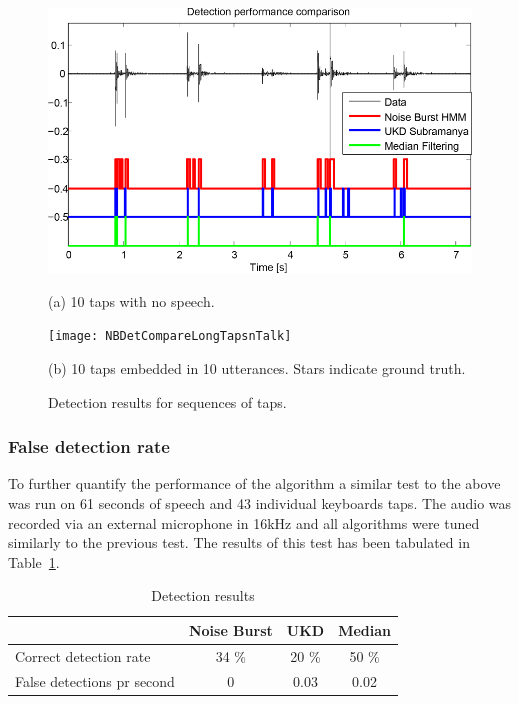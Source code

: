 \begin{figure}
\begin{minipage}[b]{1.0\linewidth}
  \centering
  \centerline{\includegraphics[width=12.5cm]{NBDetCompareLongTaps}}
  \centerline{(a) 10 taps with no speech.}\medskip
\end{minipage}
%
\begin{minipage}[b]{1.0\linewidth}
  \centering
  \centerline{\texttt{[image: NBDetCompareLongTapsnTalk]}}
  \centerline{(b) 10 taps embedded in 10 utterances. Stars indicate ground truth.}\medskip
\end{minipage}
\hfill
%
\caption{Detection results for sequences of taps.}
\label{fig:NBDetectionResults}
\end{figure}

\subsubsection{False detection rate}
To further quantify the performance of the algorithm a similar test to the above was run on 61 seconds of speech and 43 individual keyboards taps. The audio was recorded via an external microphone in 16kHz and all algorithms were tuned similarly to the previous test. The results of this test has been tabulated in Table~\ref{table:NBResultsTest}.

\begin{table}
\caption{Detection results}
\centering
\begin{tabular}{|l | c c c|}
\hline
                            & Noise Burst   & UKD       & Median        \\
 \hline
 Correct detection rate     & 34 \%         & 20 \%     & 50 \%         \\
 False detections pr second & 0             & 0.03      & 0.02          \\
 \hline
 \end{tabular}
 \label{table:NBResultsTest}
\end{table}
\todo{******}

